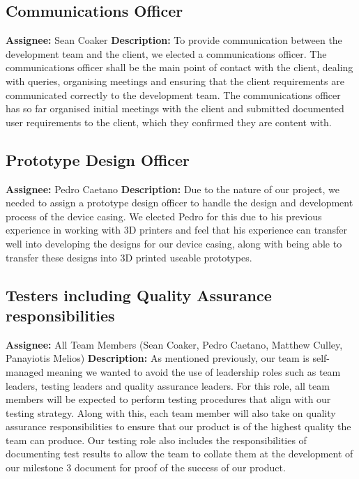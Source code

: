         \subsection{Communications Officer}
            \textbf{Assignee: } Sean Coaker\newline
            \textbf{Description: } To provide communication between the development team and the client, we elected a communications officer. The communications officer shall be the main point of contact with the client, dealing with queries, organising meetings and ensuring that the client requirements are communicated correctly to the development team. The communications officer has so far organised initial meetings with the client and submitted documented user requirements to the client, which they confirmed they are content with.

        \subsection{Prototype Design Officer}
            \textbf{Assignee: } Pedro Caetano\newline
            \textbf{Description: } Due to the nature of our project, we needed to assign a prototype design officer to handle the design and development process of the device casing. We elected Pedro for this due to his previous experience in working with 3D printers and feel that his experience can transfer well into developing the designs for our device casing, along with being able to transfer these designs into 3D printed useable prototypes.

        \subsection{Testers including Quality Assurance responsibilities}
            \textbf{Assignee: } All Team Members (Sean Coaker, Pedro Caetano, Matthew Culley, Panayiotis Melios)\newline
            \textbf{Description: } As mentioned previously, our team is self-managed meaning we wanted to avoid the use of leadership roles such as team leaders, testing leaders and quality assurance leaders. For this role, all team members will be expected to perform testing procedures that align with our testing strategy. Along with this, each team member will also take on quality assurance responsibilities to ensure that our product is of the highest quality the team can produce. Our testing role also includes the responsibilities of documenting test results to allow the team to collate them at the development of our milestone 3 document for proof of the success of our product.

